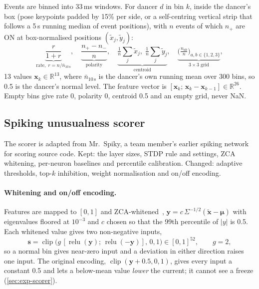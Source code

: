 \documentclass[10pt]{article}
\newcommand{\R}{\mathbb{R}}
\newcommand{\relu}{\operatorname{relu}}
\newcommand{\clip}{\operatorname{clip}}
\begin{document}
Events are binned into 33\,ms windows. For dancer $d$ in bin $k$, inside the dancer's box (pose keypoints padded by 15\% per side, or a self-centring vertical strip that follows a 5\,s running median of event positions), with $n$ events of which $n_{+}$ are ON at box-normalised positions $(\tilde x_j,\tilde y_j)$:
\begin{equation}
  \underbrace{\frac{r}{1+r}}_{\text{rate},\; r = n/\bar n_{10\,\mathrm{s}}}, \quad
  \underbrace{\frac{n_+ - n_-}{n}}_{\text{polarity}}, \quad
  \underbrace{\tfrac1n\textstyle\sum_j \tilde x_j,\; \tfrac1n\sum_j \tilde y_j}_{\text{centroid}}, \quad
  \underbrace{\big(\tfrac{n_{ab}}{n}\big)_{a,b\in\{1,2,3\}}}_{3\times3 \text{ grid}},
  \label{eq:features}
\end{equation}
13 values $\mathbf{x}_k\in\R^{13}$, where $\bar n_{10\,\mathrm{s}}$ is the dancer's own running mean over 300 bins, so 0.5 is the dancer's normal level. The feature vector is $[\mathbf{x}_k;\, \mathbf{x}_k-\mathbf{x}_{k-1}] \in\R^{26}$. Empty bins give rate 0, polarity 0, centroid 0.5 and an empty grid, never NaN.

\subsection{Spiking unusualness scorer}
\label{sec:scorer}

The scorer is adapted from Mr.\ Spiky, a team member's earlier spiking network for scoring source code. Kept: the layer sizes, STDP rule and settings, ZCA whitening, per-neuron baselines and percentile calibration. Changed: adaptive thresholds, top-$k$ inhibition, weight normalisation and on/off encoding.

\paragraph{Whitening and on/off encoding.} Features are mapped to $[0,1]$ and ZCA-whitened~\cite{kessy2018whitening}, $\mathbf{y} = c\,\Sigma^{-1/2}(\tilde{\mathbf{x}}-\bm\mu)$ with eigenvalues floored at $10^{-3}$ and $c$ chosen so that the 99th percentile of $|y|$ is 0.5. Each whitened value gives two non-negative inputs,
\begin{equation}
  \mathbf{s} = \clip\!\big(g\,[\relu(\mathbf{y});\, \relu(-\mathbf{y})],\,0,1\big)\in[0,1]^{52}, \qquad g = 2,
  \label{eq:onoff}
\end{equation}
so a normal bin gives near-zero input and a deviation in either direction raises one input. The original encoding, $\clip(\mathbf{y}+0.5,0,1)$, gives every input a constant 0.5 and lets a below-mean value \emph{lower} the current; it cannot see a freeze (\cref{sec:exp-scorer}).
\end{document}
